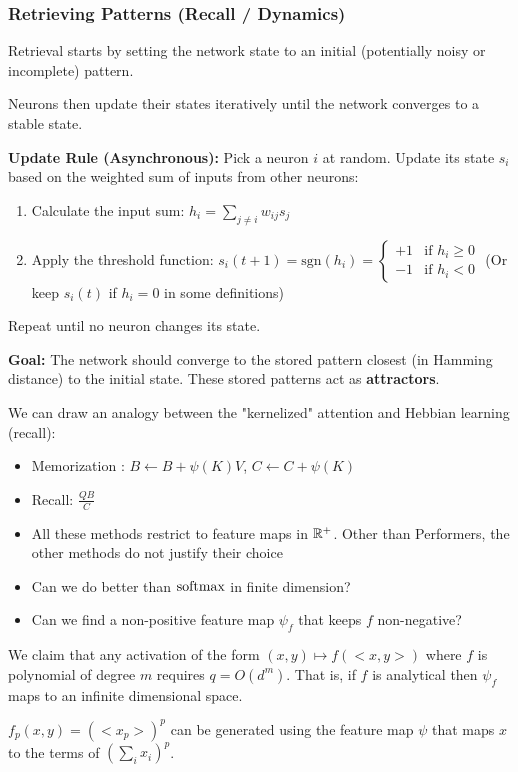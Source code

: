 \documentclass[aspectratio=169]{beamer}
\begin{document}
\begin{frame}
	\frametitle{Retrieving Patterns (Recall / Dynamics)}
	Retrieval starts by setting the network state to an initial (potentially noisy or incomplete) pattern.

	Neurons then update their states iteratively until the network converges to a
	stable state.

	\textbf{Update Rule (Asynchronous):}
	Pick a neuron $i$ at random. Update its state $s_i$ based on the weighted sum of inputs from other neurons:
	\begin{enumerate}
		\item Calculate the input sum: $h_i = \sum_{j \neq i} w_{ij} s_j$
		\item Apply the threshold function: $s_i(t+1) = \text{sgn}(h_i) =
			      \begin{cases} +1 & \text{if } h_i \ge 0 \\ -1 & \text{if } h_i < 0 \end{cases}$
		      (Or keep $s_i(t)$ if $h_i=0$ in some definitions)
	\end{enumerate}
	Repeat until no neuron changes its state.

	\vspace{0.5em}
	\textbf{Goal:} The network should converge to the stored pattern closest (in Hamming distance) to the initial state. These stored patterns act as \textbf{attractors}.
\end{frame}

\begin{frame}
	We can draw an analogy between the "kernelized" attention and Hebbian learning (recall):

	\begin{itemize}
		\item Memorization : $B \leftarrow B +\psi(K)V$, $C \leftarrow C + \psi(K)$
		\item Recall: $\frac{QB}{C}$
	\end{itemize}
\end{frame}

\begin{frame}
	\begin{itemize}
		\item  All these methods restrict to feature maps in $\mathbb{R}^+$. Other than
		      Performers, the other methods do not justify their choice
		\item Can we do better than $\mathrm{softmax}$ in finite dimension?
		\item Can we find a non-positive feature map $\psi_f$ that keeps $f$
		      non-negative?
	\end{itemize}

	We claim that any activation of the form $(x,y) \mapsto f(<x,y>)$ where $f$ is
	polynomial of degree $m$ requires $q = O(d^m)$. That is, if $f$ is analytical
	then $\psi_f$ maps to an infinite dimensional space.

	$f_p(x,y)= (<x_p>)^p$ can be generated using the feature map $\psi$ that maps $x$ to the terms
	of $(\sum_i x_i)^p$.

\end{frame}
\end{document}
